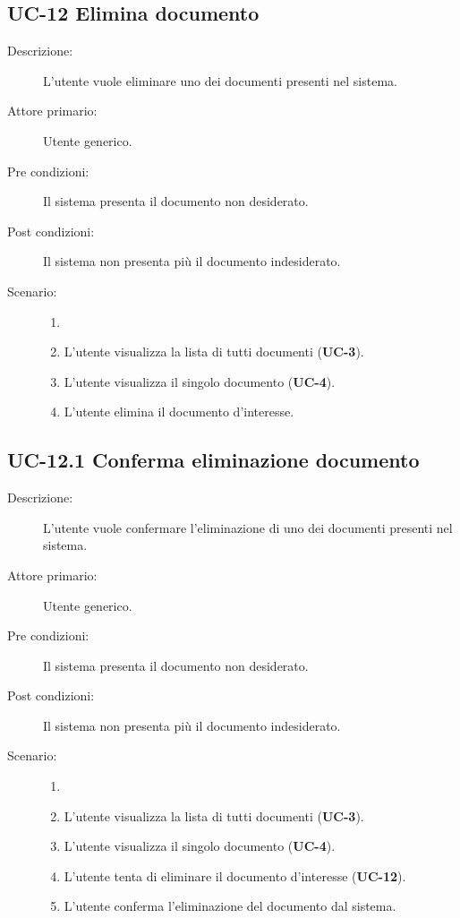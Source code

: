 \subsection{UC-12 Elimina documento}
\begin{description}
    \item[Descrizione:] L'utente vuole eliminare uno dei documenti presenti nel sistema.
    \item[Attore primario:] Utente generico.
    \item[Pre condizioni:] Il sistema presenta il documento non desiderato.
    \item[Post condizioni:] Il sistema non presenta più il documento indesiderato.
    \item[Scenario:]
    \begin{enumerate}
        \item[]
        \item L’utente visualizza la lista di tutti documenti (\textbf{UC-3}).
        \item L'utente visualizza il singolo documento (\textbf{UC-4}).
        \item L'utente elimina il documento d'interesse.
    \end{enumerate} 
\end{description}

\subsection{UC-12.1 Conferma eliminazione documento}
\begin{description}
    \item[Descrizione:] L'utente vuole confermare l'eliminazione di uno dei documenti presenti nel sistema.
    \item[Attore primario:] Utente generico.
    \item[Pre condizioni:] Il sistema presenta il documento non desiderato.
    \item[Post condizioni:] Il sistema non presenta più il documento indesiderato.
    \item[Scenario:] 
    \begin{enumerate}
        \item[]
        \item L’utente visualizza la lista di tutti documenti (\textbf{UC-3}).
        \item L'utente visualizza il singolo documento (\textbf{UC-4}).
        \item L'utente tenta di eliminare il documento d'interesse (\textbf{UC-12}).
        \item L'utente conferma l'eliminazione del documento dal sistema.
    \end{enumerate}
    
\end{description}

